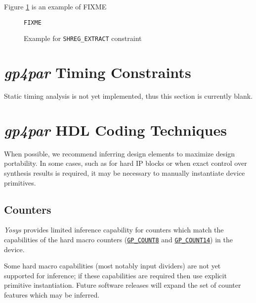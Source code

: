 \documentclass[11pt]{article}
\newcommand{\namestyle}[1]{\textit{#1}}
\newcommand{\tokenstyle}[1]{\texttt{#1}}
\newcommand{\tokenref}[2]{\hyperref[#2]{\tokenstyle{#1}}}
\begin{document}
Figure \ref{constraint-shreg-extract} is an example of FIXME

\begin{figure}[h]
\begin{lstlisting}
FIXME
\end{lstlisting}
\caption{Example for \tokenstyle{SHREG\_EXTRACT} constraint}
\label{constraint-shreg-extract}
\end{figure}


\pagebreak
\section{\namestyle{gp4par} Timing Constraints}

Static timing analysis is not yet implemented, thus this section is currently blank.


\pagebreak
\section{\namestyle{gp4par} HDL Coding Techniques}

When possible, we recommend inferring design elements to maximize design portability. In some cases, such as for hard
IP blocks or when exact control over synthesis results is required, it may be necessary to manually instantiate device
primitives.


\subsection{Counters}

\namestyle{Yosys} provides limited inference capability for counters which match the capabilities of the hard macro counters
(\tokenref{GP\_COUNT8}{gp-count8} and \tokenref{GP\_COUNT14}{gp-count14}) in the device.

Some hard macro capabilities (most notably input dividers) are not yet supported for inference; if these capabilities
are required then use explicit primitive instantiation. Future software releases will expand the set of counter
features which may be inferred.
\end{document}
